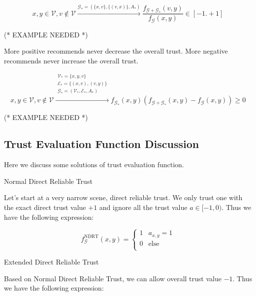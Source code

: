 \documentclass{article}
\begin{document}
\begin{equation}
x,y\in \mathcal{V},v\notin \mathcal{V}\overset{\mathcal{G}_*=\left(\{x,v\},\{(v,x)\},A_*\right)}{\to }\frac{f_{\mathcal{G}+\mathcal{G}_*}(v,y)}{f_{\mathcal{G}}(x,y)}\in
[-1.+1]
\end{equation}

(* EXAMPLE NEEDED *)

More positive recommends never decrease the overall trust. More negative recommends never increase the overall trust.

\begin{equation}
x,y\in \mathcal{V},v\notin \mathcal{V}\overset{
\begin{array}{c}
 \mathcal{V}_*=\{x,y,v\} \\
 \mathcal{E}_*=\{(x,v),(v,y)\} \\
 \mathcal{G}_*=\left(\mathcal{V}_*,\mathcal{E}_*,A_*\right) \\
\end{array}
}{\to }f_{\mathcal{G}_*}(x,y)\left(f_{\mathcal{G}+\mathcal{G}_*}(x,y)-f_{\mathcal{G}}(x,y)\right)\geq 0
\end{equation}

(* EXAMPLE NEEDED *)


\subsection{Trust Evaluation Function Discussion}

Here we discuss some solutions of trust evaluation function.

Normal Direct Reliable Trust

Let{'}s start at a very narrow scene, direct reliable trust. We only trust one with the exact direct trust value \(+1\) and ignore all the trust
value \(a\in [-1,0)\). Thus we have the following expression:

\begin{equation}
f_{\mathcal{G}}^{\text{NDRT}}(x,y)=\left\{
\begin{array}{cc}
 1 & a_{x,y}=1 \\
 0 & \text{else} \\
\end{array}
\right.
\end{equation}

Extended Direct Reliable Trust

Based on Normal Direct Reliable Trust, we can allow overall trust value \(-1\). Thus we have the following expression:
\end{document}
